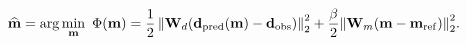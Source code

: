 \begin{equation}
\label{eq:richards-objective}
\widehat{\mathbf{m}} =
{\rm arg}\min_{\mathbf{m}}\ \Phi ( \mathbf{m} ) =
\frac{1}{2} \left\|\mathbf{W}_d (\mathbf{d}_{\rm pred}(\mathbf{m})- \mathbf{d}_{\rm obs}) \right\|^2_2+
\frac { \beta  }{ 2 } { \left\| \mathbf{W}_m(\mathbf{m}- \mathbf{m} _{\rm ref }) \right\|  }^2_2.
\end{equation}
